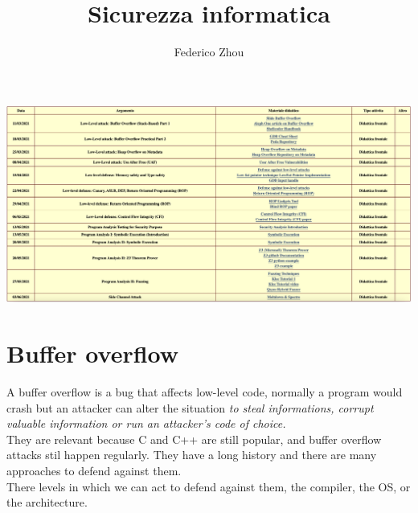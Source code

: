 \documentclass[11pt, oneside]{article}   	%
\title{Sicurezza informatica}
\author{Federico Zhou}
\begin{document}
\maketitle
\includegraphics[scale=0.3]{programma}
\section{Buffer overflow}
A buffer overflow is a bug that affects low-level code, normally a program would crash but an attacker can alter the situation \emph{to steal informations, corrupt valuable information or run an attacker's code of choice.}\\
They are relevant because C and C++ are still popular, and buffer overflow attacks stil happen regularly.
They have a long history and there are many approaches to defend against them.\\
There levels in which we can act to defend against them, the compiler, the OS, or the architecture.
\end{document}
